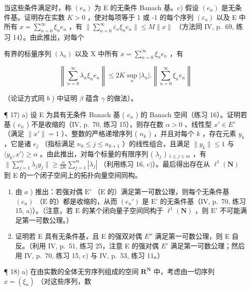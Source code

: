 当这些条件满足时，称 \((e_n)\) 为 E 的无条件 Banach 基。c) 假设 \((e_n)\) 是无条件基。证明存在实数 \(K > 0\) ，使对每项等于 1 或 -1 的每个序列 \((\varepsilon_n)\) 以及 E 中所有 \(x = \sum_{n=0}^{\infty} \xi_n e_n\) ，有 \(\| \sum_{n=0}^{\infty} \varepsilon_n \xi_n e_n \| \leqslant M \| x\|\) （方法同 IV, p.~69, 练习 14）。由此推出，对每个

有界的标量序列 \((\lambda_{n})\) 以及 X 中所有 \(x = \sum_{n=0}^{\infty} \xi_{n} e_{n}\) ，有

\[
\left\| \sum_ {n = 0} ^ {\infty} \lambda_ {n} \xi_ {n} e _ {n} \right\| \leqslant 2 K \sup _ {n} | \lambda_ {n} |. \left\| \sum_ {n = 0} ^ {\infty} \xi_ {n} e _ {n} \right\|
\]

（论证方式同 \(b\) ) 中证明 \(\beta\) 蕴含 \(\gamma\) 的做法）。

¶ 17) a) 设 E 为具有无条件 Banach 基 ( \(e_n\) ) 的 Banach 空间（练习 16）。证明若基 ( \(e_n\) ) 不是收缩的（IV, p.~70, 练习 15），则存在数 \(\alpha > 0\) 、线性型 \(x' \in E'\) （满足 \(\|x'\| = 1\) ）、整数的严格递增序列 ( \(n_k\) ) ，并且对每个 \(k\) ，存在元素 \(y_k\) ，它是诸 \(e_j\) （指标满足 \(n_k \leqslant j \leqslant n_{k+1}\) ）的线性组合，且满足 \(\|y_k\| \leqslant 1\) 与 \(\langle y_k, x' \rangle \geqslant \alpha\) 。由此推出，对每个标量的有限序列 ( \(\lambda_j\) ) \(_{1 \leqslant j \leqslant m}\) ，有 \(\|\sum_{j=1}^{m} \lambda_j y_j\| \geqslant \frac{\alpha}{2K} \sum_{j=1}^{m} |\lambda_j|\) （利用练习 16, c)）。最后得出存在从 \(\ell^1 (\mathbf{N})\) 到 E 的一个闭子空间上的拓扑向量空间同构。

\begin{enumerate}
\def\labelenumi{\alph{enumi})}
\setcounter{enumi}{1}
\item
  由 \(a\) ) 推出：若强对偶 \(\mathrm{E}'\) （\(\mathrm{E}\) 的）满足第一可数公理，则每个无条件基 \((e_n)\) （\(\mathrm{E}\) 的）都是收缩的，从而 \((e_n')\) 是 \(\mathrm{E}'\) 的无条件基（IV, p.~70, 练习 15, a)）。（注意，若 \(\mathrm{E}\) 的某个闭向量子空间同构于 \(\ell^1(\mathbf{N})\) ，则 \(\mathrm{E}'\) 不可能满足第一可数公理。）
\item
  证明若 E 具有无条件基，且 E 的强双对偶 \(E''\) 满足第一可数公理，则 E 自反。（利用 IV, p.~51, 练习 25，注意 E 的强对偶 \(E'\) 满足第一可数公理；然后用 IV, p.~70, 练习 15, c) 与 IV, p.~53, 练习 11。）
\end{enumerate}

¶ 18) a) 在由实数的全体无穷序列组成的空间 \(\mathbf{R}^{\mathbf{N}}\) 中，考虑由一切序列 \(x = (\xi_n)\) （对这些序列，数

